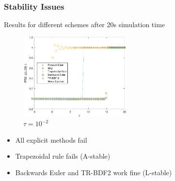 \begin{frame}{}
    \frametitle{Stability Issues}
    Results for different schemes after 20s simulation time
    \begin{multicols}{2}
        \begin{figure}
            \centering
            \includegraphics[width=0.5\textwidth]{figures/tau1e-2.pdf}
            \caption{$\tau=10^{-2}$}
        \end{figure}{}
        \vfill\null
        \columnbreak
        \begin{itemize}
            \item All explicit methods fail \\
            \item Trapezoidal rule fails (A-stable)\\
            \item Backwards Euler and TR-BDF2 work fine (L-stable)\\
        \end{itemize}{}
        \vfill\null
        \columnbreak
    \end{multicols}
\end{frame}{}






